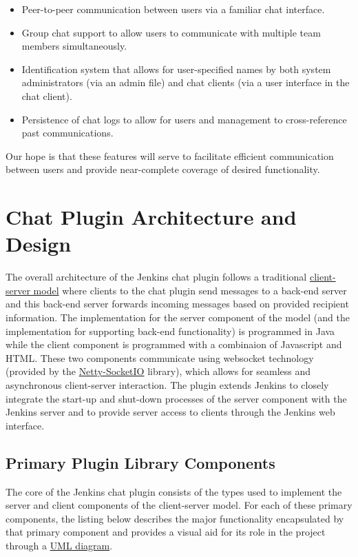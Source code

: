 \documentclass{article}
\begin{document}
		\begin{itemize}
			\item Peer-to-peer communication between users via a familiar chat
			interface.
			\item Group chat support to allow users to communicate with multiple
			team members simultaneously.
			\item Identification system that allows for user-specified names by
			both system administrators (via an admin file) and chat clients
			(via a user interface in the chat client).
			\item Persistence of chat logs to allow for users and management to 
			cross-reference past communications.
		\end{itemize}
		
		Our hope is that these features will serve to facilitate efficient
		communication between users and provide near-complete coverage of desired
		functionality.


	\section[Architecture and Design]{Chat Plugin Architecture and Design}
	The overall architecture of the Jenkins chat plugin follows a traditional
	\href{http://en.wikipedia.org/wiki/Client\%E2\%80\%93server\textunderscore model}{client-server model} 
	where clients to the chat plugin send messages to
	a back-end server and this back-end server forwards incoming messages 
	based on provided recipient information.  The implementation for the server 
	component of the model (and the implementation for supporting back-end
	functionality) is programmed in Java while the client component is
	programmed with a combinaion of Javascript and HTML.  These two components
	communicate using websocket technology (provided by the 
	\href{https://github.com/mrniko/netty-socketio/releases}{Netty-SocketIO} library), 
	which allows for seamless and asynchronous client-server interaction.
	The plugin extends Jenkins to closely integrate the start-up and shut-down
	processes of the server component with the Jenkins server and to provide
	server access to clients through the Jenkins web interface.

		\subsection[Primary Components]{Primary Plugin Library Components}
		The core of the Jenkins chat plugin consists of the types used to
		implement the server and client components of the client-server model.
		For each of these primary components, the listing below describes the
		major functionality encapsulated by that primary component and provides
		a visual aid for its role in the project through a 
		\href{http://www.csci.csusb.edu/dick/samples/uml0.html}{UML diagram}.
\end{document}
